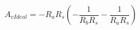\begin{equation}
A_{v Ideal} = - R_{a} R_{s} \left(- \frac{1}{R_{b} R_{s}} - \frac{1}{R_{a} R_{s}}\right)
\end{equation}

